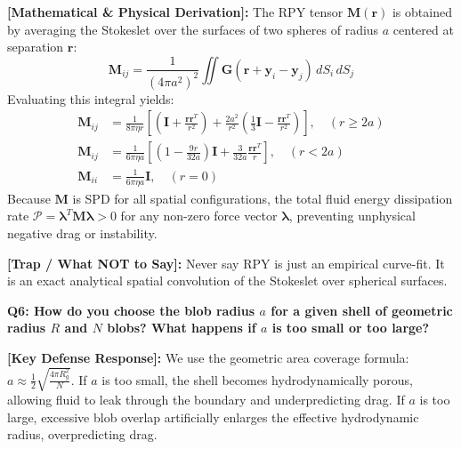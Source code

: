 \documentclass[11pt,a4paper]{article}
\newcommand{\question}[2]{
    \vspace{0.4cm}
    \noindent\colorbox{blue!10}{\parbox{\dimexpr\textwidth-2\fboxsep\relax}{
        \textbf{#1: #2}
    }}
    \vspace{0.2cm}
}
\newcommand{\shortanswer}[1]{
    \noindent\textbf{\textcolor{green!50!black}{[Key Defense Response]:}} #1
    \vspace{0.2cm}
}
\newcommand{\deepdetails}[1]{
    \noindent\textbf{\textcolor{blue!60!black}{[Mathematical \& Physical Derivation]:}} #1
    \vspace{0.2cm}
}
\newcommand{\pitfall}[1]{
    \noindent\textbf{\textcolor{red!70!black}{[Trap / What NOT to Say]:}} #1
    \vspace{0.3cm}
}
\begin{document}
\deepdetails{
The RPY tensor $\mathbf{M}(\mathbf{r})$ is obtained by averaging the Stokeslet over the surfaces of two spheres of radius $a$ centered at separation $\mathbf{r}$:
\begin{equation}
    \mathbf{M}_{ij} = \frac{1}{(4\pi a^2)^2} \iint \mathbf{G}(\mathbf{r} + \mathbf{y}_i - \mathbf{y}_j) \, dS_i \, dS_j
\end{equation}
Evaluating this integral yields:
\begin{align}
    \mathbf{M}_{ij} &= \frac{1}{8\pi\eta r} \left[ \left(\mathbf{I} + \frac{\mathbf{r}\mathbf{r}^T}{r^2}\right) + \frac{2a^2}{r^2}\left(\frac{1}{3}\mathbf{I} - \frac{\mathbf{r}\mathbf{r}^T}{r^2}\right) \right], \quad (r \ge 2a) \\
    \mathbf{M}_{ij} &= \frac{1}{6\pi\eta a} \left[ \left(1 - \frac{9r}{32a}\right)\mathbf{I} + \frac{3}{32a}\frac{\mathbf{r}\mathbf{r}^T}{r} \right], \quad (r < 2a) \\
    \mathbf{M}_{ii} &= \frac{1}{6\pi\eta a} \mathbf{I}, \quad (r = 0)
\end{align}
Because $\mathbf{M}$ is SPD for all spatial configurations, the total fluid energy dissipation rate $\mathcal{P} = \boldsymbol{\lambda}^T \mathbf{M} \boldsymbol{\lambda} > 0$ for any non-zero force vector $\boldsymbol{\lambda}$, preventing unphysical negative drag or instability.
}

\pitfall{Never say RPY is just an empirical curve-fit. It is an exact analytical spatial convolution of the Stokeslet over spherical surfaces.}

\vspace{0.4cm}
\question{Q6}{How do you choose the blob radius $a$ for a given shell of geometric radius $R$ and $N$ blobs? What happens if $a$ is too small or too large?}

\shortanswer{We use the geometric area coverage formula: $a \approx \frac{1}{2}\sqrt{\frac{4\pi R_g^2}{N}}$. If $a$ is too small, the shell becomes hydrodynamically porous, allowing fluid to leak through the boundary and underpredicting drag. If $a$ is too large, excessive blob overlap artificially enlarges the effective hydrodynamic radius, overpredicting drag.}
\end{document}
